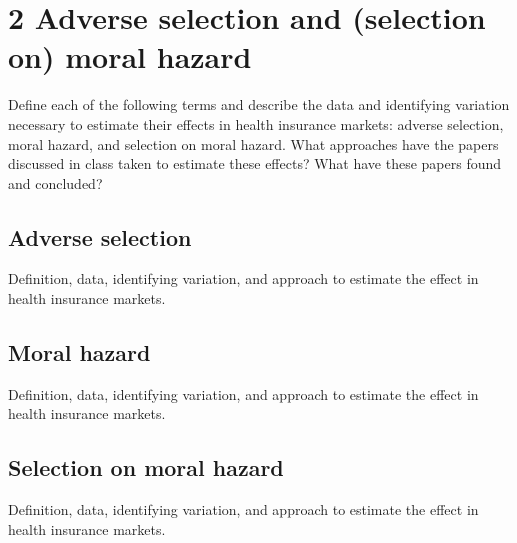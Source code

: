 \documentclass{article}
\begin{document}
\section*{2 Adverse selection and (selection on) moral hazard}

Define each of the following terms and describe the data and identifying variation necessary to estimate their effects in health insurance markets: adverse selection, moral hazard, and selection on moral hazard. What approaches have the papers discussed in class taken to estimate these effects? What have these papers found and concluded?

\subsection*{Adverse selection}
Definition, data, identifying variation, and approach to estimate the effect in health insurance markets.

\subsection*{Moral hazard}
Definition, data, identifying variation, and approach to estimate the effect in health insurance markets.

\subsection*{Selection on moral hazard}
Definition, data, identifying variation, and approach to estimate the effect in health insurance markets.
\end{document}
